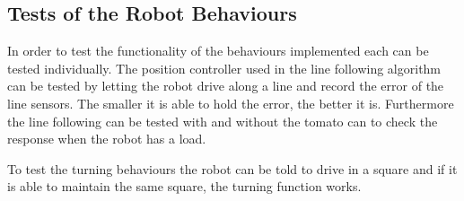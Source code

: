 
\subsection{Tests of the Robot Behaviours}
In order to test the functionality of the behaviours implemented each can be tested individually.
The position controller used in the line following algorithm can be tested by letting the robot drive along a line and record the error of the line sensors.
The smaller it is able to hold the error, the better it is.
Furthermore the line following can be tested with and without the tomato can to check the response when the robot has a load.

To test the turning behaviours the robot can be told to drive in a square and if it is able to maintain the same square, the turning function works.


